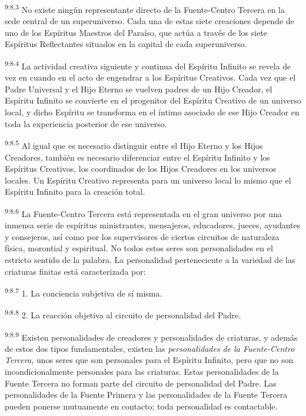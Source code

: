 \par
\textsuperscript{9:8.3} No existe ningún representante directo de la Fuente-Centro Tercera en la sede central de un superuniverso. Cada una de estas siete creaciones depende de uno de los Espíritus Maestros del Paraíso, que actúa a través de los siete Espíritus Reflectantes situados en la capital de cada superuniverso.

\par
\textsuperscript{9:8.4} La actividad creativa siguiente y continua del Espíritu Infinito se revela de vez en cuando en el acto de engendrar a los Espíritus Creativos. Cada vez que el Padre Universal y el Hijo Eterno se vuelven padres de un Hijo Creador, el Espíritu Infinito se convierte en el progenitor del Espíritu Creativo de un universo local, y dicho Espíritu se transforma en el íntimo asociado de ese Hijo Creador en toda la experiencia posterior de ese universo.

\par
\textsuperscript{9:8.5} Al igual que es necesario distinguir entre el Hijo Eterno y los Hijos Creadores, también es necesario diferenciar entre el Espíritu Infinito y los Espíritus Creativos, los coordinados de los Hijos Creadores en los universos locales. Un Espíritu Creativo representa para un universo local lo mismo que el Espíritu Infinito para la creación total.

\par
\textsuperscript{9:8.6} La Fuente-Centro Tercera está representada en el gran universo por una inmensa serie de espíritus ministrantes, mensajeros, educadores, jueces, ayudantes y consejeros, así como por los supervisores de ciertos circuitos de naturaleza física, morontial y espiritual. No todos estos seres son personalidades en el estricto sentido de la palabra. La personalidad perteneciente a la variedad de las criaturas finitas está caracterizada por:

\par
\textsuperscript{9:8.7} 1. La conciencia subjetiva de sí misma.

\par
\textsuperscript{9:8.8} 2. La reacción objetiva al circuito de personalidad del Padre.

\par
\textsuperscript{9:8.9} Existen personalidades de creadores y personalidades de criaturas, y además de estos dos tipos fundamentales, existen las \textit{personalidades de la Fuente-Centro Tercera,} unos seres que son personales para el Espíritu Infinito, pero que no son incondicionalmente personales para las criaturas. Estas personalidades de la Fuente Tercera no forman parte del circuito de personalidad del Padre. Las personalidades de la Fuente Primera y las personalidades de la Fuente Tercera pueden ponerse mutuamente en contacto; toda personalidad es contactable.


